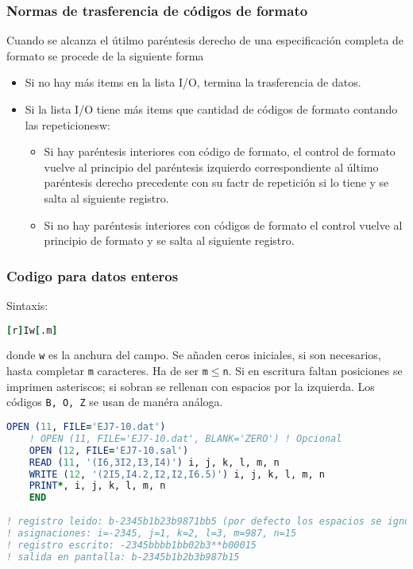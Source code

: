 \subsubsection{Normas de trasferencia de códigos de formato}

Cuando se alcanza el útilmo paréntesis derecho de una especificación completa de formato se procede de la siguiente forma

\begin{itemize}
	\item Si no hay más items en la lista I/O, termina la trasferencia de datos.
	\item Si la lista I/O tiene más items que cantidad de códigos de formato contando las repeticionesw:
	\begin{itemize}
		\item Si hay paréntesis interiores con código de formato, el control de formato vuelve al principio del paréntesis izquierdo correspondiente al último paréntesis derecho precedente con su factr de repetición si lo tiene y se salta al siguiente registro.
		\item Si no hay paréntesis interiores con códigos de formato el control vuelve al principio de formato y se salta al siguiente registro.
	\end{itemize}
\end{itemize}

\subsubsection{Codigo para datos enteros}

Sintaxis:

\begin{lstlisting}[language=Fortran]
	[r]Iw[.m] 
\end{lstlisting}
donde {\tt w} es la anchura del campo. Se añaden ceros iniciales, si son necesarios, hasta completar {\tt m} caracteres. Ha de ser {\tt m$\leq$n}. Si en escritura faltan posiciones se imprimen asteriscos; si sobran se rellenan con espacios por la izquierda. Los códigos {\tt B, O, Z} se usan de manéra análoga.

\begin{lstlisting}[language=Fortran]
	OPEN (11, FILE='EJ7-10.dat')
	! OPEN (11, FILE='EJ7-10.dat', BLANK='ZERO') ! Opcional
	OPEN (12, FILE='EJ7-10.sal')
	READ (11, '(I6,3I2,I3,I4)') i, j, k, l, m, n
	WRITE (12, '(2I5,I4.2,I2,I2,I6.5)') i, j, k, l, m, n
	PRINT*, i, j, k, l, m, n
	END
	
! registro leido: b-2345b1b23b9871bb5 (por defecto los espacios se ignoran)
! asignaciones: i=-2345, j=1, k=2, l=3, m=987, n=15
! registro escrito: -2345bbbb1bb02b3**b00015
! salida en pantalla: b-2345b1b2b3b987b15
\end{lstlisting}	


